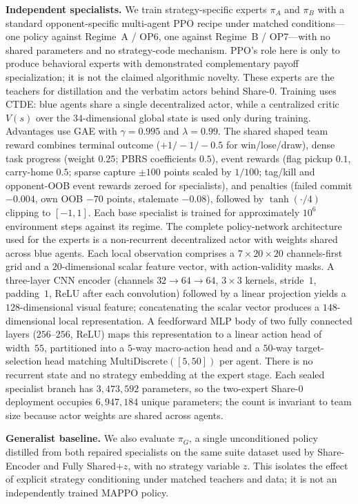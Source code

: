 \documentclass{article}
\begin{document}
\textbf{Independent specialists.}
We train strategy-specific experts $\pi_A$ and $\pi_B$ with a standard
opponent-specific multi-agent PPO recipe under matched conditions---one policy
against Regime~A / OP6, one against Regime~B / OP7---with no shared parameters
and no strategy-code mechanism. PPO's role here is only to produce behavioral
experts with demonstrated complementary payoff specialization; it is not the
claimed algorithmic novelty. These experts are the teachers for distillation and
the verbatim actors behind Share-0.
Training uses CTDE: blue agents share a single decentralized actor, while a
centralized critic $V(s)$ over the $34$-dimensional global state is used only
during training. Advantages use GAE with $\gamma=0.995$ and $\lambda=0.99$.
The shared shaped team reward combines terminal outcome ($+1/-1/-0.5$ for
win/lose/draw), dense task progress (weight $0.25$; PBRS coefficients $0.5$),
event rewards (flag pickup $0.1$, carry-home $0.5$; sparse capture $\pm100$
points scaled by $1/100$; tag/kill and opponent-OOB event rewards zeroed for
specialists), and penalties (failed commit $-0.004$, own OOB $-70$ points,
stalemate $-0.08$), followed by $\tanh(\cdot/4)$ clipping to $[-1,1]$.
Each base specialist is trained for approximately $10^6$ environment steps
against its regime.
The complete policy-network architecture used for the experts is a non-recurrent
decentralized actor with weights shared across blue agents.
Each local observation comprises a $7{\times}20{\times}20$ channels-first grid and a
$20$-dimensional scalar feature vector, with action-validity masks.
A three-layer CNN encoder (channels $32\!\to\!64\!\to\!64$, $3{\times}3$ kernels,
stride~$1$, padding~$1$, ReLU after each convolution) followed by a linear
projection yields a $128$-dimensional visual feature; concatenating the scalar
vector produces a $148$-dimensional local representation.
A feedforward MLP body of two fully connected layers ($256$--$256$, ReLU) maps
this representation to a linear action head of width~$55$, partitioned into a
$5$-way macro-action head and a $50$-way target-selection head matching
$\mathrm{MultiDiscrete}([5,50])$ per agent.
There is no recurrent state and no strategy embedding at the expert stage.
Each sealed specialist branch has $3{,}473{,}592$ parameters, so the two-expert
Share-0 deployment occupies $6{,}947{,}184$ unique parameters; the count is
invariant to team size because actor weights are shared across agents.

\textbf{Generalist baseline.}
We also evaluate $\pi_G$, a single unconditioned policy distilled from both
repaired specialists on the same suite dataset used by Share-Encoder and Fully
Shared+$z$, with no strategy variable $z$. This isolates the effect of explicit
strategy conditioning under matched teachers and data; it is not an
independently trained MAPPO policy.
\end{document}
